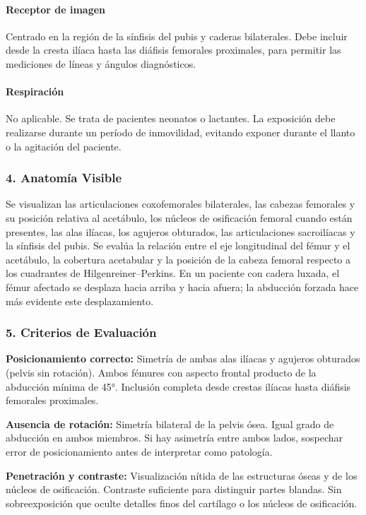 	\paragraph{Receptor de imagen}
	Centrado en la región de la sínfisis del pubis y caderas bilaterales. Debe incluir desde la cresta ilíaca hasta las diáfisis femorales proximales, para permitir las mediciones de líneas y ángulos diagnósticos.
	
	\paragraph{Respiración}
	No aplicable. Se trata de pacientes neonatos o lactantes. La exposición debe realizarse durante un período de inmovilidad, evitando exponer durante el llanto o la agitación del paciente.
	
	\subsubsection*{4. Anatomía Visible}
	
	Se visualizan las articulaciones coxofemorales bilaterales, las cabezas femorales y su posición relativa al acetábulo, los núcleos de osificación femoral cuando están presentes, las alas ilíacas, los agujeros obturados, las articulaciones sacroilíacas y la sínfisis del pubis. Se evalúa la relación entre el eje longitudinal del fémur y el acetábulo, la cobertura acetabular y la posición de la cabeza femoral respecto a los cuadrantes de Hilgenreiner--Perkins. En un paciente con cadera luxada, el fémur afectado se desplaza hacia arriba y hacia afuera; la abducción forzada hace más evidente este desplazamiento.
	
	\subsubsection*{5. Criterios de Evaluación}
	
	\textbf{Posicionamiento correcto:} Simetría de ambas alas ilíacas y agujeros obturados (pelvis sin rotación). Ambos fémures con aspecto frontal producto de la abducción mínima de 45°. Inclusión completa desde crestas ilíacas hasta diáfisis femorales proximales.
	
	\textbf{Ausencia de rotación:} Simetría bilateral de la pelvis ósea. Igual grado de abducción en ambos miembros. Si hay asimetría entre ambos lados, sospechar error de posicionamiento antes de interpretar como patología.
	
	\textbf{Penetración y contraste:} Visualización nítida de las estructuras óseas y de los núcleos de osificación. Contraste suficiente para distinguir partes blandas. Sin sobreexposición que oculte detalles finos del cartílago o los núcleos de osificación.
	
